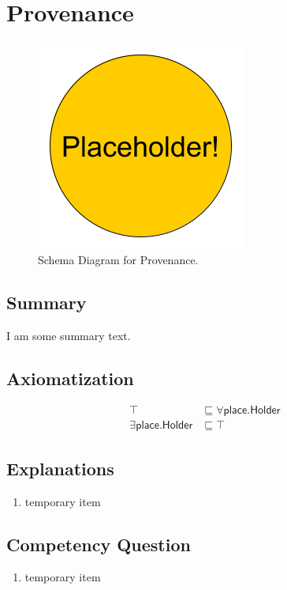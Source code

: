 \section{Provenance}
\label{sec:Provenance}
\begin{figure}[h!]
\begin{center}
\includegraphics[width=.4\textwidth]{figures/placeholder}
\end{center}
\caption{Schema Diagram for Provenance.}
\label{fig:Provenance}
\end{figure}
\subsection{Summary}
\label{sum:Provenance}
I am some summary text.

\subsection{Axiomatization}
\label{axs:Provenance}
\begin{align}
\top &\sqsubseteq \forall\textsf{place.Holder} \\ 
\exists\textsf{place.Holder} &\sqsubseteq \top 
\end{align}

\subsection{Explanations}
\label{exp:Provenance}
\begin{enumerate}
\item temporary item
\end{enumerate}

\subsection{Competency Question}
\label{cqs:Provenance}
\begin{enumerate}[CQ1.]
\item temporary item
\end{enumerate}

\newpage
